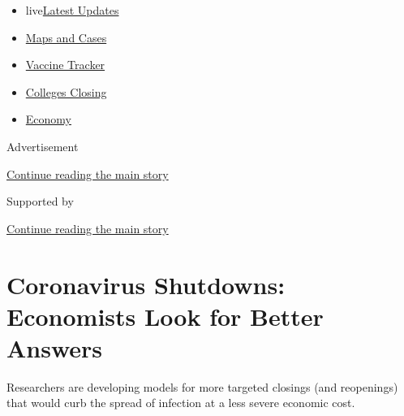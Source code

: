 \begin{itemize}
\tightlist
\item
  live\href{https://www.nytimes3xbfgragh.onion/2020/08/20/world/coronavirus-covid.html?name=styln-coronavirus-markets\&region=TOP_BANNER\&variant=undefined\&block=storyline_menu_recirc\&action=click\&pgtype=Article\&impression_id=e07b1661-e385-11ea-a6bd-919622e83b69}{Latest
  Updates}
\item
  \href{https://www.nytimes3xbfgragh.onion/interactive/2020/us/coronavirus-us-cases.html?name=styln-coronavirus-markets\&region=TOP_BANNER\&variant=undefined\&block=storyline_menu_recirc\&action=click\&pgtype=Article\&impression_id=e07b1662-e385-11ea-a6bd-919622e83b69}{Maps
  and Cases}
\item
  \href{https://www.nytimes3xbfgragh.onion/interactive/2020/science/coronavirus-vaccine-tracker.html?name=styln-coronavirus-markets\&region=TOP_BANNER\&variant=undefined\&block=storyline_menu_recirc\&action=click\&pgtype=Article\&impression_id=e07b1663-e385-11ea-a6bd-919622e83b69}{Vaccine
  Tracker}
\item
  \href{https://www.nytimes3xbfgragh.onion/2020/08/19/us/colleges-closing-covid.html?name=styln-coronavirus-markets\&region=TOP_BANNER\&variant=undefined\&block=storyline_menu_recirc\&action=click\&pgtype=Article\&impression_id=e07b1664-e385-11ea-a6bd-919622e83b69}{Colleges
  Closing}
\item
  \href{https://www.nytimes3xbfgragh.onion/live/2020/08/20/business/stock-market-today-coronavirus?name=styln-coronavirus-markets\&region=TOP_BANNER\&variant=undefined\&block=storyline_menu_recirc\&action=click\&pgtype=Article\&impression_id=e07b1665-e385-11ea-a6bd-919622e83b69}{Economy}
\end{itemize}

Advertisement

\protect\hyperlink{after-top}{Continue reading the main story}

Supported by

\protect\hyperlink{after-sponsor}{Continue reading the main story}

\hypertarget{coronavirus-shutdowns-economists-look-for-better-answers}{%
\section{Coronavirus Shutdowns: Economists Look for Better
Answers}\label{coronavirus-shutdowns-economists-look-for-better-answers}}

Researchers are developing models for more targeted closings (and
reopenings) that would curb the spread of infection at a less severe
economic cost.

